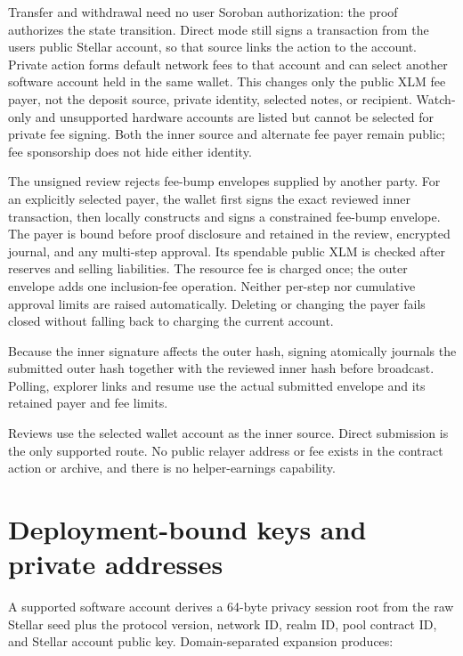 \documentclass[11pt,letterpaper]{article}
\begin{document}
Transfer and withdrawal need no user Soroban authorization: the proof
authorizes the state transition. Direct mode still signs a transaction
from the user\textquotesingle s public Stellar account, so that source
links the action to the account. Private action forms default network
fees to that account and can select another software account held in the
same wallet. This changes only the public XLM fee payer, not the deposit
source, private identity, selected notes, or recipient. Watch-only and
unsupported hardware accounts are listed but cannot be selected for
private fee signing. Both the inner source and alternate fee payer
remain public; fee sponsorship does not hide either identity.

The unsigned review rejects fee-bump envelopes supplied by another
party. For an explicitly selected payer, the wallet first signs the
exact reviewed inner transaction, then locally constructs and signs a
constrained fee-bump envelope. The payer is bound before proof
disclosure and retained in the review, encrypted journal, and any
multi-step approval. Its spendable public XLM is checked after reserves
and selling liabilities. The resource fee is charged once; the outer
envelope adds one inclusion-fee operation. Neither per-step nor
cumulative approval limits are raised automatically. Deleting or
changing the payer fails closed without falling back to charging the
current account.

Because the inner signature affects the outer hash, signing atomically
journals the submitted outer hash together with the reviewed inner hash
before broadcast. Polling, explorer links and resume use the actual
submitted envelope and its retained payer and fee limits.

Reviews use the selected wallet account as the inner source. Direct
submission is the only supported route. No public relayer address or fee
exists in the contract action or archive, and there is no
helper-earnings capability.

\section{Deployment-bound keys and private
addresses}\label{deployment-bound-keys-and-private-addresses}

A supported software account derives a 64-byte privacy session root from
the raw Stellar seed plus the protocol version, network ID, realm ID,
pool contract ID, and Stellar account public key. Domain-separated
expansion produces:
\end{document}
